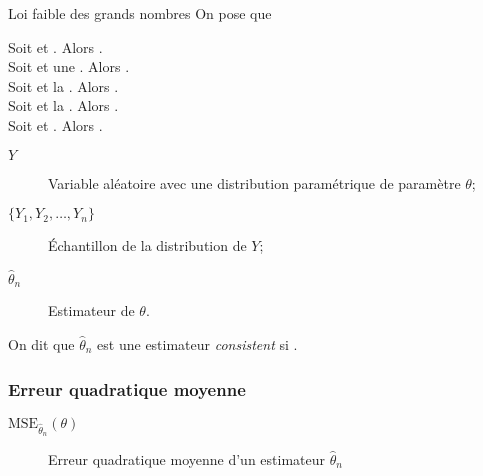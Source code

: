 \documentclass[10pt, french]{article}
\begin{document}
\begin{multicols*}{2}
\begin{rappel}{Loi faible des grands nombres}
On pose que 
\end{rappel}

\begin{definitionNOHFILLsub}
Soit  et . Alors .\\
Soit  et une . Alors .\\
Soit  et la . Alors .\\
Soit  et la . Alors .\\
Soit  et . Alors .
\end{definitionNOHFILLsub}

\begin{definitionNOHFILL}
\begin{distributions}[Notation]
\begin{description}
	\item[$Y$]	Variable aléatoire avec une distribution paramétrique de paramètre $\theta$;
	\item[$\{Y_{1}, Y_{2}, \dots, Y_{n}\}$]	Échantillon de la distribution de $Y$;
	\item[$\hat{\theta}_{n}$]	Estimateur de $\theta$.
\end{description}
\end{distributions}

On dit que $\hat{\theta}_{n}$ est une estimateur \og \textit{consistent} \fg{} si .
\end{definitionNOHFILL}


\subsubsection{Erreur quadratique moyenne}
\begin{distributions}[Notation]
\begin{description}
	\item[$\text{MSE}_{\hat{\theta}_{n}}(\theta)$]	Erreur quadratique moyenne d'un estimateur $\hat{\theta}_{n}$
\end{description}
\end{distributions}


\end{multicols*}
\end{document}
